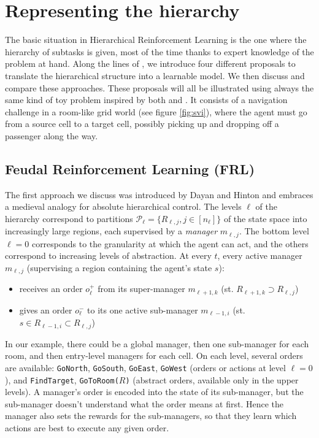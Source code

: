 \documentclass{article}
\begin{document}
\section{Representing the hierarchy} \label{representing}

The basic situation in Hierarchical Reinforcement Learning is the one where the hierarchy of subtasks is given, most of the time thanks to expert knowledge of the problem at hand. Along the lines of \cite{barto_recent_2003}, we introduce four different proposals to translate the hierarchical structure into a learnable model. We then discuss and compare these approaches. These proposals will all be illustrated using always the same kind of toy problem inspired by both \cite{dietterich_hierarchical_2000} and \cite{sutton_between_1999}. It consists of a navigation challenge in a room-like grid world (see figure \ref{fig:svi}), where the agent must go from a source cell to a target cell, possibly picking up and dropping off a passenger along the way.

\subsection{Feudal Reinforcement Learning (FRL)}

The first approach we discuss was introduced by Dayan and Hinton \cite{dayan_feudal_1993} and embraces a medieval analogy for absolute hierarchical control. The levels $\ell$ of the hierarchy correspond to partitions $\mathcal{P}_{\ell} = \{R_{\ell, j}, j \in [n_{\ell}]\}$ of the state space into increasingly large regions, each supervised by a \textit{manager} $m_{\ell, j}$. The bottom level $\ell = 0$ corresponds to the granularity at which the agent can act, and the others correspond to increasing levels of abstraction. At every $t$, every active manager $m_{\ell, j}$ (supervising a region containing the agent's state $s$):
\begin{itemize}
    \item receives an order $o_{\ell}^+$ from its super-manager $m_{\ell+1, k}$ (st. $R_{\ell+1, k}  \supset R_{\ell, j}$)
    \item gives an order $o_{\ell}^-$ to its one active sub-manager $m_{\ell-1, i}$ (st. $s \in R_{\ell-1, i} \subset R_{\ell, j}$)
\end{itemize}

In our example, there could be a global manager, then one sub-manager for each room, and then entry-level managers for each cell. On each level, several orders are available: \texttt{GoNorth}, \texttt{GoSouth}, \texttt{GoEast}, \texttt{GoWest} (orders or actions at level $\ell=0$), and \texttt{FindTarget}, \texttt{GoToRoom($R$)} (abstract orders, available only in the upper levels). A manager's order is encoded into the state of its sub-manager, but the sub-manager doesn't understand what the order means at first. Hence the manager also sets the rewards for the sub-managers, so that they learn which actions are best to execute any given order.
\end{document}
